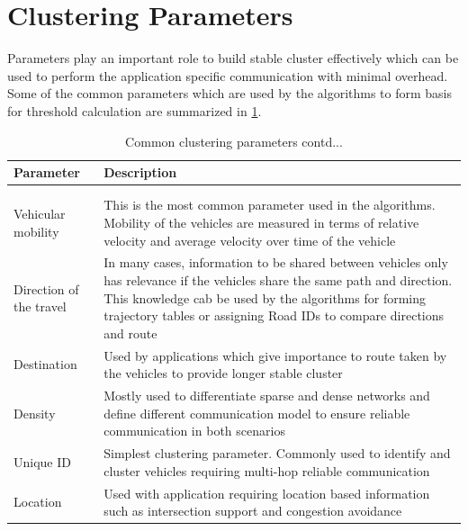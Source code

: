 \documentclass[]{ccs-thesis}
\begin{document}
\section{Clustering Parameters}

Parameters play an important role to build stable cluster effectively which can be used to perform the application
specific communication with minimal overhead. Some of the common parameters which are used by the algorithms to
form basis for threshold calculation are summarized in \cref{tab:parameters}.

\begin{longtable}{>{\raggedright}p{3.5cm}p{7.5cm}}
    \hline
    Parameter               & Description                                                                                                          \\
    \hline
    \endhead
    \hline
    \caption{Common clustering parameters}\label{tab:parameters}                                                                                   \\
    \endfoot
    \hline
    \caption{Common clustering parameters contd...}                                                                                                \\
    \endlastfoot
    Vehicular mobility      & This is the most common parameter used in the algorithms. Mobility of the vehicles are measured in terms of
    relative velocity and average velocity over time of the vehicle                                                                                \\
    Direction of the travel & In many cases, information to be shared between vehicles only has relevance if the vehicles share the same path
    and direction. This knowledge cab be used by the algorithms for forming trajectory tables or assigning Road IDs
    to compare directions and route                                                                                                                \\
    Destination             & Used by applications which give importance to route taken by the vehicles to provide longer stable cluster            \\
    Density                 & Mostly used to differentiate sparse and dense networks and define different communication model to ensure reliable
    communication in both scenarios                                                                                                                \\
    Unique ID               & Simplest clustering parameter. Commonly used to identify and cluster vehicles requiring multi-hop reliable communication \\
    Location                & Used with application requiring location based information such as intersection support and congestion avoidance     \\
\end{longtable}
\end{document}
